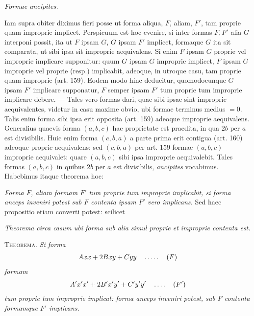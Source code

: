 \begin{center}
\textit{Formae ancipites.}
\end{center}
Iam supra obiter diximus fieri posse ut forma aliqua, \(F\), aliam, \(F'\), tam proprie quam improprie implicet. Perspicuum est hoc evenire, si inter formas \(F,F'\) alia \(G\) interponi possit, ita ut \(F\) ipsam \(G\), \(G\) ipsam \(F'\) implicet, formaque \(G\) ita sit comparata, ut sibi ipsa sit improprie aequivalens. Si enim \(F\) ipsam \(G\) proprie vel improprie implicare supponitur: quum \(G\) ipsam \(G\) improprie implicet, \(F\) ipsam \(G\) improprie vel proprie (resp.) implicabit, adeoque, in utroque casu, tam proprie quam improprie (art. 159). Eodem modo hinc deducitur, quomodocunque \(G\) ipsam \(F'\) implicare supponatur, \(F\) semper ipsam \(F'\) tum proprie tum improprie implicare debere. --- Tales vero formas dari, quae sibi ipsae sint improprie aequivalentes, videtur in casu maxime obvio, ubi formae terminus medius \(=0\). Talis enim forma sibi ipsa erit opposita (art. 159) adeoque improprie aequivalens. Generalius quaevis forma \((a,b,c)\) hac proprietate est praedita, in qua \(2b\) per \(a\) est divisibilis. Huic enim forma \((c,b,a)\) a parte prima erit contigua (art. 160) adeoque proprie aequivalens: sed \((c,b,a)\) per art. 159 formae \((a,b,c)\) improprie aequivalet: quare \((a,b,c)\) sibi ipsa improprie aequivalebit. Tales formas \((a,b,c)\) in quibus \(2b\) per \(a\) est divisibilis, \textit{ancipites} vocabimus. Habebimus itaque theorema hoc:

\textit{Forma \(F\), aliam formam \(F'\) tum proprie tum improprie implicabit, si forma anceps inveniri potest sub \(F\) contenta ipsam \(F'\) vero implicans.} Sed haec propositio etiam converti potest: scilicet

\begin{center}
\textit{Theorema circa casum ubi forma sub alia simul proprie et improprie contenta est.}
\end{center}
\textsc{Theorema.} \textit{Si forma}
\[
Axx+2Bxy+Cyy\quad\mathinner{.\,.\,.\,.\,.}\quad(F)
\]
\textit{formam}
\[
A'x'x'+2B'x'y'+C'y'y'\quad\mathinner{.\,.\,.\,.}\quad(F')
\]
\textit{tum proprie tum improprie implicat: forma anceps inveniri potest, sub \(F\) contenta formamque \(F'\) implicans.}

